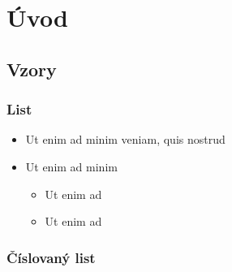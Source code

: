 \chapter*{Úvod}
\setcounter{page}{1}

\begin{chapterabstract}
	\lipsum[1]
\end{chapterabstract}

\lipsum[4]

\section{Vzory}

\subsection{List}

\begin{itemize}
    \item Ut enim ad minim veniam, quis nostrud
    \item Ut enim ad minim 
    \begin{itemize}
        \item Ut enim ad
        \item Ut enim ad
    \end{itemize}
\end{itemize}

\subsection{Číslovaný list}

